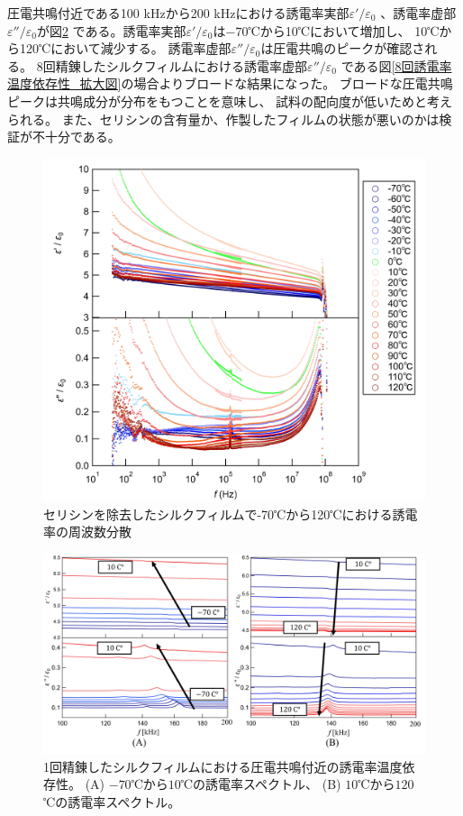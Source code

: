 \documentclass[dvipdfmx,12pt,a4paper]{jreport}
\begin{document}
			圧電共鳴付近である100 kHzから200 kHzにおける誘電率実部$\varepsilon'/\varepsilon_0$
			、誘電率虚部$\varepsilon''/\varepsilon_0$が図\ref{1回誘電率温度依存性_拡大図}
			である。誘電率実部$\varepsilon'/\varepsilon_0$は$-70$℃から10℃において増加し、
			10℃から120℃において減少する。
			誘電率虚部$\varepsilon''/\varepsilon_0$は圧電共鳴のピークが確認される。
			8回精錬したシルクフィルムにおける誘電率虚部$\varepsilon''/\varepsilon_0$
			である図\ref{8回誘電率温度依存性_拡大図}の場合よりブロードな結果になった。
			ブロードな圧電共鳴ピークは共鳴成分が分布をもつことを意味し、
			試料の配向度が低いためと考えられる。
			また、セリシンの含有量か、作製したフィルムの状態が悪いのかは検証が不十分である。
			\begin{figure}[H]
				\centering
				\includegraphics[width=\linewidth]{温度_誘電率_セリシンなし.jpg}
				\caption{セリシンを除去したシルクフィルムで-70℃から120℃における誘電率の周波数分散}
				\label{温度_誘電率_セリシンなし_全体像}
			\end{figure}
			\newpage
			\begin{figure}[h]
				\centering
				\includegraphics[width=\linewidth]{1回_誘電率温度依存性_圧電共鳴付近.jpg}
				\caption{1回精錬したシルクフィルムにおける圧電共鳴付近の誘電率温度依存性。
				(A) $-70$℃から$10$℃の誘電率スペクトル、
				(B) $10$℃から$120$℃の誘電率スペクトル。}
				\label{1回誘電率温度依存性_拡大図}
			\end{figure}
\end{document}
